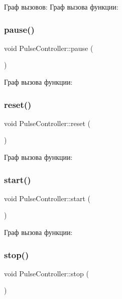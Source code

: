 Граф вызовов\+:
Граф вызова функции\+:
\mbox{\label{class_pulse_controller_a310f792764a804b50a910eeb4e53a374}} 
\subsubsection{\texorpdfstring{pause()}{pause()}}
{\footnotesize\ttfamily void Pulse\+Controller\+::pause (\begin{DoxyParamCaption}{ }\end{DoxyParamCaption})}

Граф вызова функции\+:
\mbox{\label{class_pulse_controller_a0112f4a30c50e9254e8e264f5b1ba865}} 
\subsubsection{\texorpdfstring{reset()}{reset()}}
{\footnotesize\ttfamily void Pulse\+Controller\+::reset (\begin{DoxyParamCaption}{ }\end{DoxyParamCaption})}

Граф вызова функции\+:
\mbox{\label{class_pulse_controller_a278aefbf7233ae529304a012c4690827}} 
\subsubsection{\texorpdfstring{start()}{start()}}
{\footnotesize\ttfamily void Pulse\+Controller\+::start (\begin{DoxyParamCaption}{ }\end{DoxyParamCaption})}

Граф вызова функции\+:
\mbox{\label{class_pulse_controller_abc95e9340203f77f78818f389bd99d3a}} 
\subsubsection{\texorpdfstring{stop()}{stop()}}
{\footnotesize\ttfamily void Pulse\+Controller\+::stop (\begin{DoxyParamCaption}{ }\end{DoxyParamCaption})}

